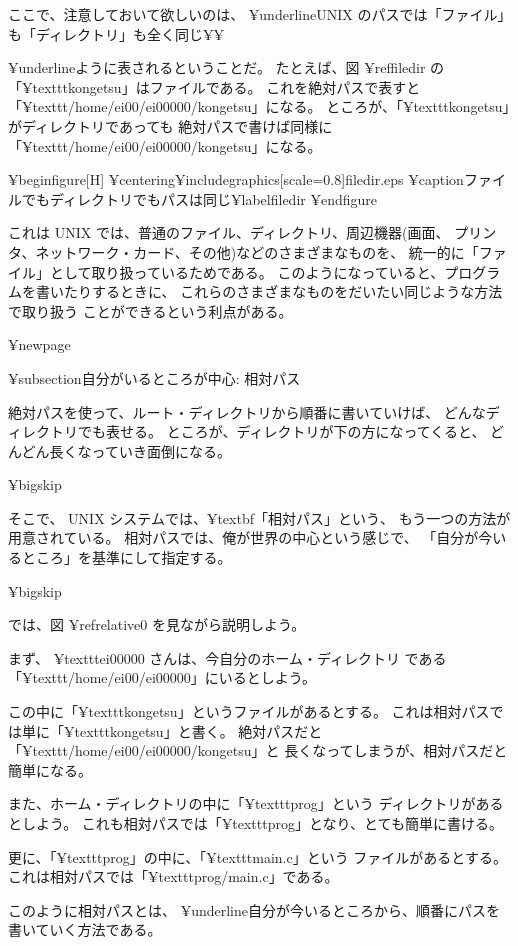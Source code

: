 ここで、注意しておいて欲しいのは、
 ¥underline{UNIX のパスでは「ファイル」も「ディレクトリ」も全く同じ}¥¥{
¥underline{ように表される}ということだ。
たとえば、図 ¥ref{filedir} の「¥texttt{kongetsu}」はファイルである。
これを絶対パスで表すと「¥texttt{/home/ei00/ei00000/kongetsu}」になる。
ところが、「¥texttt{kongetsu}」がディレクトリであっても
絶対パスで書けば同様に「¥texttt{/home/ei00/ei00000/kongetsu}」になる。

¥begin{figure}[H]
¥centering{¥includegraphics[scale=0.8]{filedir.eps}}
¥caption{ファイルでもディレクトリでもパスは同じ}¥label{filedir}
¥end{figure}

これは UNIX では、普通のファイル、ディレクトリ、周辺機器(画面、
プリンタ、ネットワーク・カード、その他)などのさまざまなものを、
統一的に「ファイル」として取り扱っているためである。
このようになっていると、プログラムを書いたりするときに、
これらのさまざまなものをだいたい同じような方法で取り扱う
ことができるという利点がある。 

¥newpage

¥subsection{自分がいるところが中心: 相対パス}

絶対パスを使って、ルート・ディレクトリから順番に書いていけば、
どんなディレクトリでも表せる。
ところが、ディレクトリが下の方になってくると、
どんどん長くなっていき面倒になる。

¥bigskip

そこで、 UNIX システムでは、¥textbf{「相対パス」}という、
もう一つの方法が用意されている。
相対パスでは、俺が世界の中心という感じで、
「自分が今いるところ」を基準にして指定する。

¥bigskip

では、図 ¥ref{relative0} を見ながら説明しよう。

まず、 ¥texttt{ei00000} さんは、今自分のホーム・ディレクトリ
である「¥texttt{/home/ei00/ei00000}」にいるとしよう。

この中に「¥texttt{kongetsu}」というファイルがあるとする。
これは相対パスでは単に「¥texttt{kongetsu}」と書く。
絶対パスだと「¥texttt{/home/ei00/ei00000/kongetsu}」と
長くなってしまうが、相対パスだと簡単になる。

また、ホーム・ディレクトリの中に「¥texttt{prog}」という
ディレクトリがあるとしよう。
これも相対パスでは「¥texttt{prog}」となり、とても簡単に書ける。

更に、「¥texttt{prog}」の中に、「¥texttt{main.c}」という
ファイルがあるとする。
これは相対パスでは「¥texttt{prog/main.c}」である。

このように相対パスとは、
¥underline{自分が今いるところから、順番にパスを書いていく}方法である。

}
